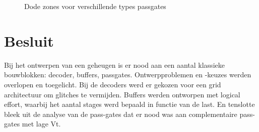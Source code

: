 \begin{figure}[!ht]
\caption[Dode zones voor verschillende types passgates]{Dode zones voor verschillende types passgates}
\label{fig:passgate3}
\end{figure}



\section{Besluit}
Bij het ontwerpen van een geheugen is er nood aan een aantal klassieke bouwblokken: decoder, buffers, passgates. Ontwerpproblemen en -keuzes werden overlopen en toegelicht. Bij de decoders werd er gekozen voor een grid architectuur om glitches te vermijden. Buffers werden ontworpen met logical effort, waarbij het aantal stages werd bepaald in functie van de last. En tenslotte bleek uit de analyse van de pass-gates dat er nood was aan complementaire pass-gates met lage Vt.
